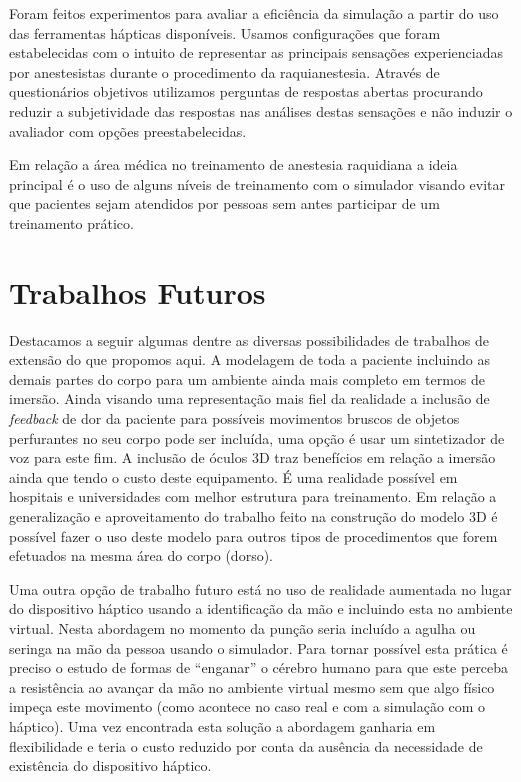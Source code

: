 Foram feitos experimentos para avaliar a eficiência da simulação a partir do uso das ferramentas hápticas disponíveis. Usamos configurações que foram estabelecidas com o intuito de representar as principais sensações experienciadas por anestesistas durante o procedimento da raquianestesia. Através de questionários objetivos utilizamos perguntas de respostas abertas procurando reduzir a subjetividade das respostas nas análises destas sensações e não induzir o avaliador com opções preestabelecidas.  

Em relação a área médica no treinamento de anestesia raquidiana a ideia principal é o uso de alguns níveis de treinamento com o simulador visando evitar que pacientes sejam atendidos por pessoas sem antes participar de um treinamento prático.

\section{Trabalhos Futuros}
\label{sec:trabFuturo}

Destacamos a seguir algumas dentre as diversas possibilidades de trabalhos de extensão do que propomos aqui. A modelagem de toda a paciente incluindo as demais partes do corpo para um ambiente ainda mais completo em termos de imersão. Ainda visando uma representação mais fiel da realidade a inclusão de \textit{feedback} de dor da paciente para possíveis movimentos bruscos de objetos perfurantes no seu corpo pode ser incluída, uma opção é usar um sintetizador de voz para este fim. A inclusão de óculos 3D traz benefícios em relação a imersão ainda que tendo o custo deste equipamento. É uma realidade possível em hospitais e universidades com melhor estrutura para treinamento.
Em relação a generalização e aproveitamento do trabalho feito na construção do modelo 3D é possível fazer o uso deste modelo para outros tipos de procedimentos que forem efetuados na mesma área do corpo (dorso). 

Uma outra opção de trabalho futuro está no uso de realidade aumentada no lugar do dispositivo háptico usando a identificação da mão e incluindo esta no ambiente virtual. Nesta abordagem no momento da punção seria incluído a agulha ou seringa na mão da pessoa usando o simulador. Para tornar possível esta prática é preciso o estudo de formas de ``enganar'' o cérebro humano para que este perceba a resistência ao avançar da mão no ambiente virtual mesmo sem que algo físico impeça este movimento (como acontece no caso real e com a simulação com o háptico). Uma vez encontrada esta solução a abordagem ganharia em flexibilidade e teria o custo reduzido por conta da ausência da necessidade de existência do dispositivo háptico.